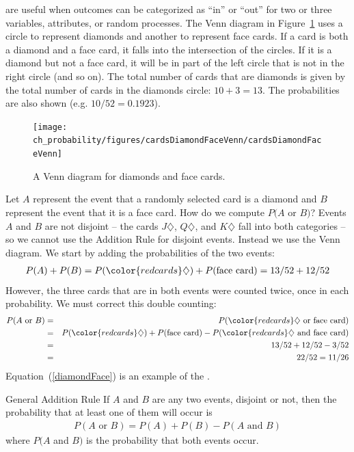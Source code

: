  are useful when outcomes can be categorized as ``in'' or ``out'' for two or three variables, attributes, or random processes. The Venn diagram in Figure~\ref{cardsDiamondFaceVenn} uses a circle to represent diamonds and another to represent face cards. If a card is both a diamond and a face card, it falls into the intersection of the circles. If it is a diamond but not a face card, it will be in part of the left circle that is not in the right circle (and so on). The total number of cards that are diamonds is given by the total number of cards in the diamonds circle: $10+3=13$. The probabilities are also shown (e.g. $10/52 = 0.1923$).

\begin{figure}
\centering
\texttt{[image: ch\_probability/figures/cardsDiamondFaceVenn/cardsDiamondFaceVenn]}
\caption{A Venn diagram for diamonds and face cards.}
\label{cardsDiamondFaceVenn}
\end{figure}

Let $A$ represent the event that a randomly selected card is a diamond and $B$ represent the event that it is a face card. How do we compute $P(A$ or $B)$? Events $A$ and $B$ are not disjoint -- the cards {\color{redcards}$J\diamondsuit$}, {\color{redcards}$Q\diamondsuit$}, and {\color{redcards}$K\diamondsuit$} fall into both categories -- so we cannot use the Addition Rule for disjoint events. Instead we use the Venn diagram. We start by adding the probabilities of the two events:
\begin{eqnarray*}
P(A) + P(B)
  = P({\color{redcards}\diamondsuit}) + P(\text{face card})
  = 13/52 + 12/52
\label{overCountFaceDiamond}
\end{eqnarray*}
However, the three cards that are in both events were counted twice, once in each probability. We must correct this double counting:
\begin{eqnarray}
P(A\text{ or } B) &=&P({\color{redcards}\diamondsuit}\text{ or face card})  \notag \\
  &=& P({\color{redcards}\diamondsuit}) + P(\text{face card}) - P({\color{redcards}\diamondsuit}\text{ and face card}) \label{diamondFace} \\
  &=& 13/52 + 12/52 - 3/52 \notag \\
  &=& 22/52 = 11/26 \notag
\end{eqnarray}
Equation~(\ref{diamondFace}) is an example of the . 

\begin{onebox}{General Addition Rule} If $A$ and $B$ are any two events, disjoint or not, then the probability that at least one of them will occur is
\begin{eqnarray}
P(A\text{ or }B) = P(A) + P(B) - P(A\text{ and }B)
\label{generalAdditionRule}
\end{eqnarray}
where $P(A$ and $B)$ is the probability that both events occur.
\end{onebox}

